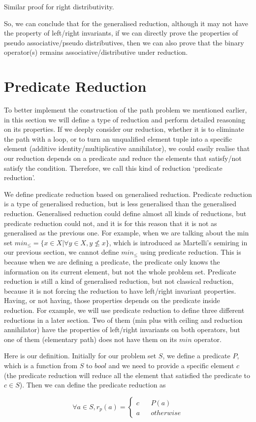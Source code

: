 \documentclass[a4paper,12pt,twoside,openright]{report}
\newcommand{\e}[2]{
\begin{equation}
  \label{#1} 
  #2
\end{equation}
}
\begin{document}
Similar proof for right distributivity. 

So, we can conclude that for the generalised reduction, although it may not have the property of left/right invariants, if we can directly prove the properties of pseudo associative/pseudo distributives, then we can also prove that the binary operator(s) remains associative/distributive under reduction.

\section{Predicate Reduction}
To better implement the construction of the path problem we mentioned earlier, in this section we will define a type of reduction and perform detailed reasoning on its properties. 
If we deeply consider our reduction, whether it is to eliminate the path with a loop, or to turn an unqualified element tuple into a specific element (additive identity/multiplicative annihilator), we could easily realise that our reduction depends on a predicate and reduce the elements that satisfy/not satisfy the condition. Therefore, we call this kind of reduction ‘predicate reduction’. 

We define predicate reduction based on generalised reduction. 
Predicate reduction is a type of generalised reduction, but is less generalised than the generalised reduction.  Generalised reduction could define almost all kinds of reductions, but predicate reduction could not, and it is for this reason that it is not as generalised as the previous one. For example, when we are talking about the min set $min_\leq = \{ x \in X | \forall y \in X, y \not\leq x \}$, which is introduced as Martelli’s semiring in our previous section, we cannot define $min_\leq$ using predicate reduction. This is because when we are defining a predicate, the predicate only knows the information on its current element, but not the whole problem set. Predicate reduction is still a kind of generalised reduction, but not classical reduction, because it is not forcing the reduction to have left/right invariant properties. Having, or not having, those properties depends on the predicate inside reduction. For example, we will use predicate reduction to define three different reductions in a later section. Two of them (min plus with ceiling and reduction annihilator) have the properties of left/right invariants on both operators, but one of them (elementary path) does not have them on its $min$ operator. 

Here is our definition. Initially for our problem set $S$, we define a predicate $P$, which is a function from $S$ to $bool$ and we need to provide a specific element $c$ (the predicate reduction will reduce all the element that satisfied the predicate to $c \in S$). Then we can define the predicate reduction as 
\e{pr:def:def}{\forall a \in S, r_p(a)=\left\{
\begin{aligned}
c &  & P(a) \\
a &  & otherwise 
\end{aligned}
\right.}
\end{document}
